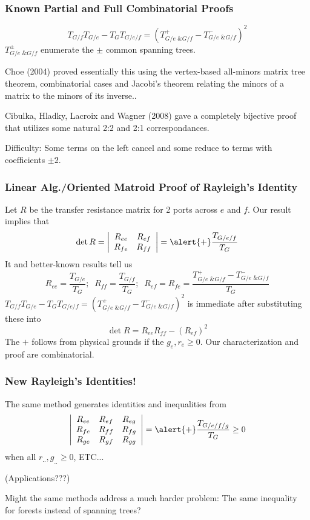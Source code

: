 \documentclass{beamer}
\newcommand{\Remph}[1]{{\color{red}#1}}
\begin{document}
\begin{frame}
\frametitle{Known Partial and Full Combinatorial Proofs}
\[
T_{G/f}T_{G/e} - T_GT_{G/e/f} = \left( T^+_{G/e \text{ \& } G/f} - T^-_{G/e \text{ \& } G/f} \right)^2
\]
$T^{\pm}_{G/e \text{ \& } G/f}$ enumerate the $\pm$ common spanning trees.

\vfill
Choe (2004) 
proved essentially this using the vertex-based all-minors matrix tree theorem,
combinatorial cases and Jacobi's theorem relating the minors of a matrix to
the minors of its inverse..

\vfill
Cibulka, Hladky, Lacroix and Wagner (2008) gave a completely bijective proof
that utilizes some natural 2:2 and 2:1 correspondances.

\vfill
\Remph{Difficulty:} Some terms on the left \Remph{cancel} and some
reduce to terms with coefficients $\pm 2$.
\vfill
\end{frame}



\begin{frame}
\frametitle{Linear Alg./Oriented Matroid Proof of Rayleigh's Identity}
Let $R$ be the transfer resistance matrix for 2 ports across $e$ and $f$.
Our result implies that
\[
\det R = \left|\begin{array}{cc} R_{ee} & R_{ef} \\ R_{fe} & R_{ff} \end{array}\right|
= \alert{+} \frac{T_{G/e/f}}{T_G}
\]
It and better-known results tell us
\[
R_{ee} = \frac{T_{G/e}}{T_G};\;\;R_{ff} = \frac{T_{G/f}}{T_G};\;\;
R_{ef}=R_{fe}=\frac{ T^+_{G/e \text{ \& } G/f} - T^-_{G/e \text{ \& } G/f} }{T_G}
\]
$T_{G/f}T_{G/e} - T_GT_{G/e/f} = \left( T^+_{G/e \text{ \& } G/f} - T^-_{G/e \text{ \& } G/f} \right)^2$
is immediate after substituting these into
\[
\det R = R_{ee}R_{ff}-(R_{ef})^2
\]
\alert{The $+$ follows from physical grounds if the $g_e, r_e \geq 0$.  Our
characterization and proof are combinatorial.}
\end{frame}

\begin{frame}
\frametitle{New Rayleigh's Identities!}

The same method generates identities and inequalities from
\[
\left|
\begin{array}{ccc} R_{ee} & R_{ef} & R_{eg} \\ 
                   R_{fe} & R_{ff} & R_{fg} \\
                   R_{ge} & R_{gf} & R_{gg}
\end{array}\right|
= \alert{+} \frac{T_{G/e/f/g}}{T_G} \ge 0
\]
when all $r_{..}, g_{..} \ge 0$, ETC...

\vfill

(Applications???)

\vfill

\Remph{Might the same methods address a much harder problem:
The same inequality for } forests \Remph{ instead of 
spanning trees?}

\vfill
\end{frame}
\end{document}
